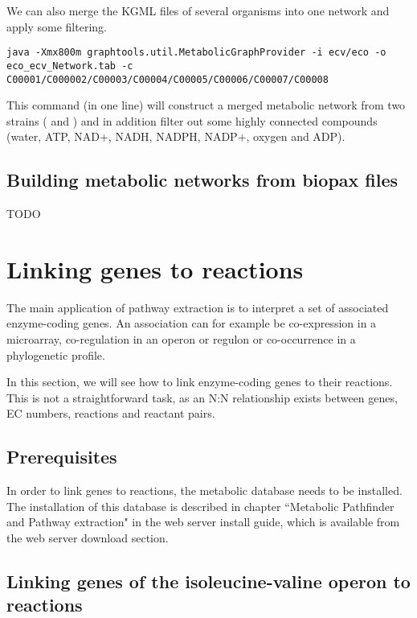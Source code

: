We can also merge the KGML files of several organisms into one network and apply
some filtering.

\begin{verbatim}
java -Xmx800m graphtools.util.MetabolicGraphProvider -i ecv/eco -o
eco_ecv_Network.tab -c C00001/C000002/C00003/C00004/C00005/C00006/C00007/C00008
\end{verbatim}

This command (in one line) will construct a merged metabolic network from two
 strains ( and ) 
and in addition filter out some highly connected compounds (water, ATP, NAD+, NADH, NADPH, NADP+, oxygen and ADP).

\subsection{Building metabolic networks from biopax files}

TODO

\section{Linking genes to reactions}

The main application of pathway extraction is to interpret a set of
associated enzyme-coding genes. An association can for example be co-expression
in a microarray, co-regulation in an operon or regulon or co-occurrence in a
phylogenetic profile.

In this section, we will see how to link enzyme-coding genes to their reactions.
This is not a straightforward task, as an N:N relationship exists between genes,
EC numbers, reactions and reactant pairs.

\subsection{Prerequisites}
In order to link genes to reactions, the metabolic database needs to be
installed. The installation of this database is described in chapter
``Metabolic Pathfinder and Pathway extraction" in the \neat web server install
guide, which is available from the \neat web server download section. 

\subsection{Linking genes of the isoleucine-valine operon to reactions}

